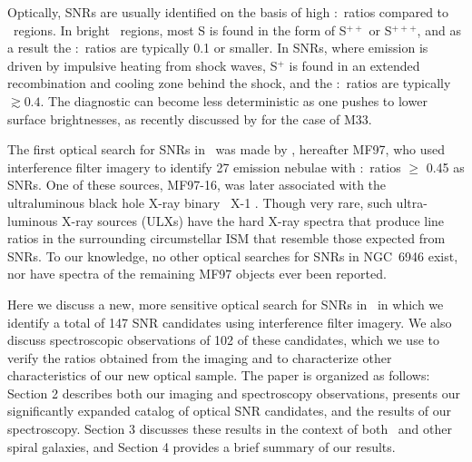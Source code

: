 Optically, SNRs are usually identified on the basis of high \sii:\ha\ ratios compared to \hii\ regions.  In bright \hii\ regions, most S is found in the form of S$^{++}$ or S$^{+++}$, and as a result the \sii:\ha\ ratios are typically 0.1 or smaller.  In SNRs, where emission is driven by impulsive heating from shock waves, S$^+$ is found in an extended recombination and cooling zone behind the shock, and the \sii:\ha\ ratios are typically $\gtrsim0.4$.  The diagnostic can become less deterministic as one pushes to lower surface brightnesses, as recently discussed by \cite{long18} for the case of M33.

The first optical search for SNRs in \gal\ was made by \cite{matonick97}, hereafter MF97, who used interference filter imagery to identify 27 emission nebulae with \sii:\ha\ ratios $\geq$ 0.45 as SNRs.  One of these sources, MF97-16, was later associated with the ultraluminous black hole X-ray binary \gal\ X-1 \citep{roberts03}. Though very rare, such ultra-luminous X-ray sources (ULXs) have  the hard X-ray spectra that produce line ratios in the surrounding circumstellar ISM that resemble those expected from SNRs. To our knowledge, no other optical searches for SNRs in NGC~6946 exist, nor have spectra of the remaining MF97 objects ever been reported.  


Here we discuss a new, more sensitive optical search for SNRs in \gal\ in which we identify a total of 147 SNR candidates using interference filter imagery.  We also discuss spectroscopic observations of 102 of these candidates, which we use to verify the ratios obtained from the imaging and to characterize other characteristics of our new optical sample.  The paper is organized as follows:  Section 2 describes both our imaging and spectroscopy observations,  presents our significantly expanded catalog of optical SNR candidates, and the results of our spectroscopy.  Section 3 discusses these results in the context of both \gal\ and other spiral galaxies, and Section 4 provides a brief summary of our results. 



